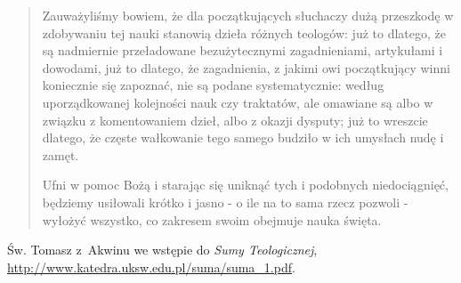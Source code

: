 \documentclass[a4paper,11pt]{article}
\begin{document}
\begin{quote}
  Zauważyliśmy bowiem, że dla początkujących słuchaczy dużą przeszkodę
  w zdobywaniu tej nauki stanowią dzieła różnych teologów: już to
  dlatego, że są nadmiernie przeładowane bezużytecznymi zagadnieniami,
  artykułami i dowodami, już to dlatego, że zagadnienia, z jakimi owi
  początkujący winni koniecznie się zapoznać, nie są podane
  systematycznie: według uporządkowanej kolejności nauk czy traktatów,
  ale omawiane są albo w związku z komentowaniem dzieł, albo z okazji
  dysputy; już to wreszcie dlatego, że częste wałkowanie tego samego
  budziło w ich umysłach nudę i zamęt.

  Ufni w pomoc Bożą i starając się uniknąć tych i podobnych
  niedociągnięć, będziemy usiłowali krótko i jasno - o ile na to sama
  rzecz pozwoli - wyłożyć wszystko, co zakresem swoim obejmuje nauka
  święta.
\end{quote}

Św. Tomasz z~Akwinu we wstępie do \emph{Sumy Teologicznej},
\url{http://www.katedra.uksw.edu.pl/suma/suma_1.pdf}.










 {}



\end{document}

